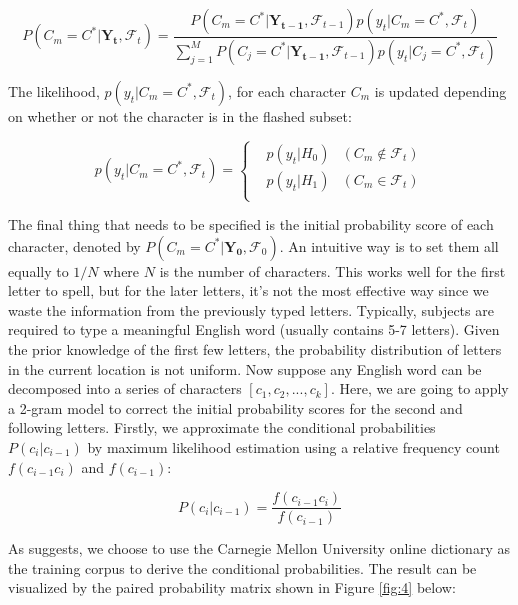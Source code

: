 \documentclass{article}
\begin{document}
\begin{equation}
	P(C_m = C^*|\mathbf{Y_t}, \mathcal{F}_t) = \frac{P(C_m = C^*|\mathbf{Y_{t-1}}, \mathcal{F}_{t-1})p(y_t|C_m = C^*, \mathcal{F}_t)}{\sum^M_{j=1}P(C_j = C^*|\mathbf{Y_{t-1}}, \mathcal{F}_{t-1})p(y_t|C_j = C^*, \mathcal{F}_t)}
\end{equation}

The likelihood, $p(y_t|C_m = C^*, \mathcal{F}_t)$, for each character $C_m$ is updated depending on whether or not the character is in the flashed subset:

\begin{equation}
	p(y_t|C_m = C^*, \mathcal{F}_t) = \left\{
	\begin{aligned}
		& p(y_t|H_0) & (C_m \notin \mathcal{F}_t) \\
		& p(y_t|H_1) & (C_m \in \mathcal{F}_t) \\
	\end{aligned} 
\right.
\end{equation}

The final thing that needs to be specified is the initial probability score of each character, denoted by $P(C_m = C^*|\mathbf{Y_0}, \mathcal{F}_0)$. An intuitive way is to set them all equally to $1/N$ where $N$ is the number of characters. This works well for the first letter to spell, but for the later letters, it's not the most effective way since we waste the information from the previously typed letters. Typically, subjects are required to type a meaningful English word (usually contains 5-7 letters). Given the prior knowledge of the first few letters, the probability distribution of letters in the current location is not uniform. Now suppose any English word can be decomposed into a series of characters $[c_1, c_2, ..., c_k]$. Here, we are going to apply a 2-gram model to correct the initial probability scores for the second and following letters. Firstly, we approximate the conditional probabilities $P(c_i|c_{i-1})$ by maximum likelihood estimation using a relative frequency count $f(c_{i-1}c_{i})$ and $f(c_{i-1})$:

\begin{equation}
	P(c_i|c_{i-1}) = \frac{f(c_{i-1}c_{i})}{f(c_{i-1})}
\end{equation}
	
As \cite{mainsah2014utilizing} suggests, we choose to use the Carnegie Mellon University online dictionary as the training corpus to derive the conditional probabilities. The result can be visualized by the paired probability matrix shown in Figure \ref{fig:4} below:
\end{document}
